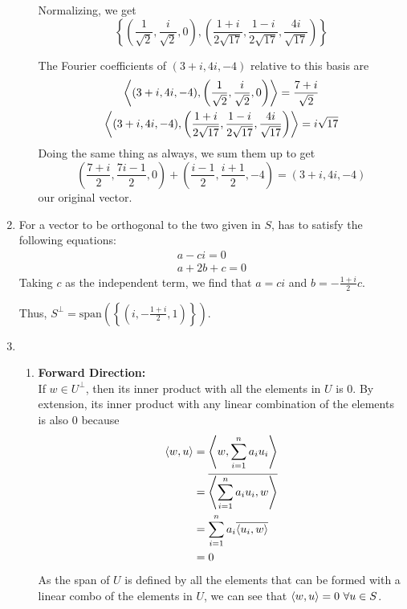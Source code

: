 \documentclass[12pt]{article}
\begin{document}
\begin{enumerate}
\begin{enumerate}
                        Normalizing, we get
                        \[\left\{\left(\frac{1}{\sqrt{2}}, \frac{i}{\sqrt{2}}, 0\right),
                        \left(\frac{1+i}{2\sqrt{17}}, \frac{1-i}{2\sqrt{17}}, \frac{4i}{\sqrt{17}}\right)\right\}\]

                        The Fourier coefficients of $(3+i, 4i, -4)$ relative to this basis are
                        \begin{gather*}
                              \Braket{(3+i, 4i, -4), \left(\frac{1}{\sqrt{2}}, \frac{i}{\sqrt{2}}, 0\right)}=\frac{7+i}{\sqrt{2}} \\
                              \Braket{(3+i, 4i, -4), \left(\frac{1+i}{2\sqrt{17}}, \frac{1-i}{2\sqrt{17}}, \frac{4i}{\sqrt{17}}\right)}=i\sqrt{17}
                        \end{gather*}
                        Doing the same thing as always, we sum them up to get
                        \[\left(\frac{7+i}{2}, \frac{7i-1}{2}, 0\right)+\left(\frac{i-1}{2}, \frac{i+1}{2}, -4\right)=(3+i, 4i, -4)\]
                        our original vector.
            \end{enumerate}
      \item For a vector to be orthogonal to the two given in $S$, has to satisfy the following equations:
            \begin{gather*}
                  a-ci=0 \\
                  a+2b+c=0
            \end{gather*}
            Taking $c$ as the independent term, we find that $a=ci$ and $b=-\frac{1+i}{2}c$.

            Thus, $S^\perp=\boxed{\text{span}\left(\left\{\left(i, -\frac{1+i}{2}, 1\right)\right\}\right)}$.
      \item \begin{enumerate}
                  \item \textbf{Forward Direction:} \\
                        If $w \in U^\perp$, then its inner product with all the elements in $U$ is $0$.
                        By extension, its inner product with any linear combination of the elements is also $0$ because
                        \begin{align*}
                              \braket{w, u} & = \Braket{w, \sum_{i=1}^{n} a_i u_i}            \\
                                            & = \overline{\Braket{\sum_{i=1}^{n} a_i u_i, w}} \\
                                            & = \sum_{i=1}^{n} a_i \overline{\braket{u_i, w}} \\
                                            & = 0
                        \end{align*}
                        As the span of $U$ is defined by all the elements that can be formed with a linear combo
                        of the elements in $U$, we can see that $\braket{w, u}=0\ \forall u \in S$.


\end{enumerate}
\end{enumerate}
\end{document}
